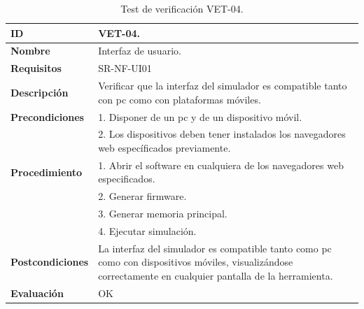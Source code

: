 \begin{center}
\begin{table}[htb]
\centering
\begin{tabular}{@{}p{2.5cm} p{13cm}@{}} 
\toprule
\textbf{ID} 					& VET-04. \\
\midrule
\textbf{Nombre} 				& Interfaz de usuario. \\
\midrule
\textbf{Requisitos} 		& SR-NF-UI01\\
\midrule
\textbf{Descripción} 		& Verificar que la interfaz del simulador es compatible tanto con pc como con plataformas móviles. \\
\midrule
\textbf{Precondiciones}		& 1. Disponer de un pc y de un dispositivo móvil. \\
											& 2. Los dispositivos deben tener instalados los navegadores web específicados previamente. \\
\midrule
\textbf{Procedimiento}			& 1. Abrir el software en cualquiera de los navegadores web especificados. \\
							& 2. Generar firmware.\\
							& 3. Generar memoria principal.\\
							& 4. Ejecutar simulación.\\
\midrule
\textbf{Postcondiciones} 		&  La interfaz del simulador es compatible tanto como pc como con dispositivos móviles, visualizándose correctamente en cualquier pantalla de la herramienta.\\
\midrule
\textbf{Evaluación} 			& OK \\
\bottomrule
\end{tabular}
\caption{Test de verificación VET-04.}
\label{tab:vet04}
\end{table}
\end{center}

